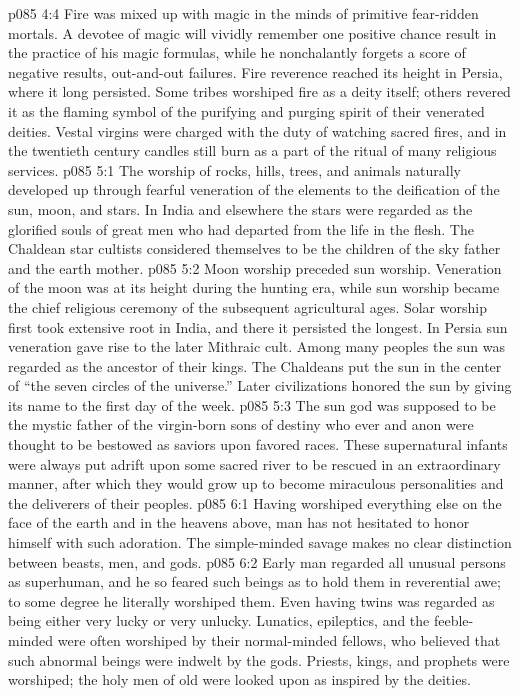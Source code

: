 \vs p085 4:4 Fire was mixed up with magic in the minds of primitive fear\hyp{}ridden mortals. A devotee of magic will vividly remember one positive chance result in the practice of his magic formulas, while he nonchalantly forgets a score of negative results, out\hyp{}and\hyp{}out failures. Fire reverence reached its height in Persia, where it long persisted. Some tribes worshiped fire as a deity itself; others revered it as the flaming symbol of the purifying and purging spirit of their venerated deities. Vestal virgins were charged with the duty of watching sacred fires, and in the twentieth century candles still burn as a part of the ritual of many religious services.\plusone
{}
\vs p085 5:1 The worship of rocks, hills, trees, and animals naturally developed up through fearful veneration of the elements to the deification of the sun, moon, and stars. In India and elsewhere the stars were regarded as the glorified souls of great men who had departed from the life in the flesh. The Chaldean star cultists considered themselves to be the children of the sky father and the earth mother.
\vs p085 5:2 Moon worship preceded sun worship. Veneration of the moon was at its height during the hunting era, while sun worship became the chief religious ceremony of the subsequent agricultural ages. Solar worship first took extensive root in India, and there it persisted the longest. In Persia sun veneration gave rise to the later Mithraic cult. Among many peoples the sun was regarded as the ancestor of their kings. The Chaldeans put the sun in the center of “the seven circles of the universe.” Later civilizations honored the sun by giving its name to the first day of the week.
\vs p085 5:3 The sun god was supposed to be the mystic father of the virgin\hyp{}born sons of destiny who ever and anon were thought to be bestowed as saviors upon favored races. These supernatural infants were always put adrift upon some sacred river to be rescued in an extraordinary manner, after which they would grow up to become miraculous personalities and the deliverers of their peoples.
\vs p085 6:1 Having worshiped everything else on the face of the earth and in the heavens above, man has not hesitated to honor himself with such adoration. The simple\hyp{}minded savage makes no clear distinction between beasts, men, and gods.
\vs p085 6:2 Early man regarded all unusual persons as superhuman, and he so feared such beings as to hold them in reverential awe; to some degree he literally worshiped them. Even having twins was regarded as being either very lucky or very unlucky. Lunatics, epileptics, and the feeble\hyp{}minded were often worshiped by their normal\hyp{}minded fellows, who believed that such abnormal beings were indwelt by the gods. Priests, kings, and prophets were worshiped; the holy men of old were looked upon as inspired by the deities.
